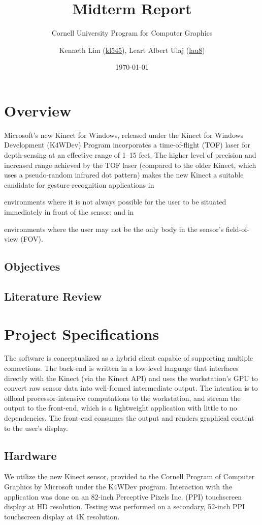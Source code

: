 \documentclass{scrartcl}
\title{Midterm Report}
\subtitle{Cornell University Program for Computer Graphics}
\author{Kenneth Lim (\href{mailto:kl545@cornell.edu}{kl545}), Leart Albert Ulaj (\href{mailto:lau8@cornell.edu}{lau8})}
\date{\today}
\begin{document}
  \maketitle
  \tableofcontents
  \newpage
  \section{Overview}
    Microsoft's new Kinect for Windows, released under the Kinect for Windows Development (K4WDev) Program incorporates a time-of-flight (TOF) laser for depth-sensing at an effective range of 1--15 feet. The higher level of precision and increased range achieved by the TOF laser (compared to the older Kinect, which uses a pseudo-random infrared dot pattern) makes the new Kinect a suitable candidate for gesture-recognition applications in
    \begin{inparaenum}[(1)]
      \item environments where it is not always possible for the user to be situated immediately in front of the sensor; and in
      \item environments where the user may not be the only body in the sensor's field-of-view (FOV).
    \end{inparaenum}
    \subsection{Objectives}
    \subsection{Literature Review}
  \section{Project Specifications}
    The software is conceptualized as a hybrid client capable of supporting multiple connections. The back-end is written in a low-level language that interfaces directly with the Kinect (via the Kinect API) and uses the workstation's GPU to convert raw sensor data into well-formed intermediate output. The intention is to offload processor-intensive computations to the workstation, and stream the output to the front-end, which is a lightweight application with little to no dependencies. The front-end consumes the output and renders graphical content to the user's display.
    \subsection{Hardware}
      We utilize the new Kinect sensor, provided to the Cornell Program of Computer Graphics by Microsoft under the K4WDev program. Interaction with the application was done on an 82-inch Perceptive Pixels Inc. (PPI) touchscreen display at HD resolution. Testing was performed on a secondary, 52-inch PPI touchscreen display at 4K resolution.
\end{document}
